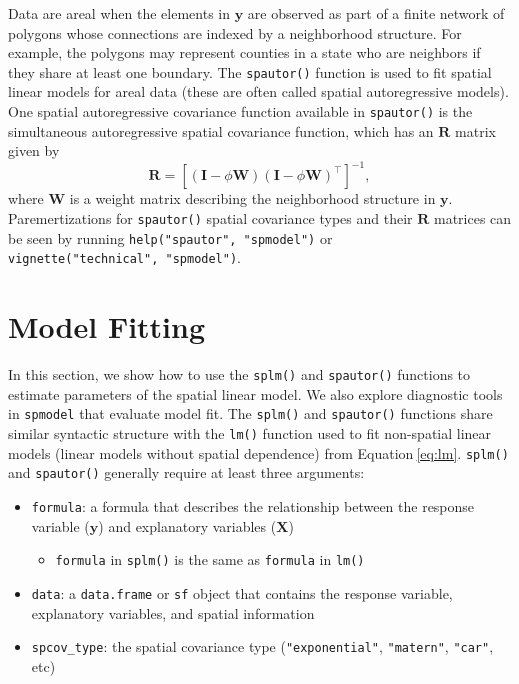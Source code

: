 \documentclass{article}
\providecommand{\tightlist}{%
  \setlength{\itemsep}{0pt}\setlength{\parskip}{0pt}}
\begin{document}
Data are areal when the elements in \(\mathbf{y}\) are observed as part
of a finite network of polygons whose connections are indexed by a
neighborhood structure. For example, the polygons may represent counties
in a state who are neighbors if they share at least one boundary. The
\texttt{spautor()} function is used to fit spatial linear models for
areal data (these are often called spatial autoregressive models). One
spatial autoregressive covariance function available in
\texttt{spautor()} is the simultaneous autoregressive spatial covariance
function, which has an \(\mathbf{R}\) matrix given by \begin{equation*}
  \mathbf{R} = [(\mathbf{I} - \phi \mathbf{W})(\mathbf{I} - \phi \mathbf{W})^\top]^{-1},
\end{equation*} where \(\mathbf{W}\) is a weight matrix describing the
neighborhood structure in \(\mathbf{y}\). Paremertizations for
\texttt{spautor()} spatial covariance types and their \(\mathbf{R}\)
matrices can be seen by running \texttt{help("spautor",\ "spmodel")} or
\texttt{vignette("technical",\ "spmodel")}.

\hypertarget{sec:modelfit}{%
\section{Model Fitting}\label{sec:modelfit}}

In this section, we show how to use the \texttt{splm()} and
\texttt{spautor()} functions to estimate parameters of the spatial
linear model. We also explore diagnostic tools in \texttt{spmodel} that
evaluate model fit. The \texttt{splm()} and \texttt{spautor()} functions
share similar syntactic structure with the \texttt{lm()} function used
to fit non-spatial linear models (linear models without spatial
dependence) from Equation\(~\)\ref{eq:lm}. \texttt{splm()} and
\texttt{spautor()} generally require at least three arguments:

\begin{itemize}
\tightlist
\item
  \texttt{formula}: a formula that describes the relationship between
  the response variable (\(\mathbf{y}\)) and explanatory variables
  (\(\mathbf{X}\))

  \begin{itemize}
  \tightlist
  \item
    \texttt{formula} in \texttt{splm()} is the same as \texttt{formula}
    in \texttt{lm()}
  \end{itemize}
\item
  \texttt{data}: a \texttt{data.frame} or \texttt{sf} object that
  contains the response variable, explanatory variables, and spatial
  information
\item
  \texttt{spcov\_type}: the spatial covariance type
  (\texttt{"exponential"}, \texttt{"matern"}, \texttt{"car"}, etc)
\end{itemize}
\end{document}
